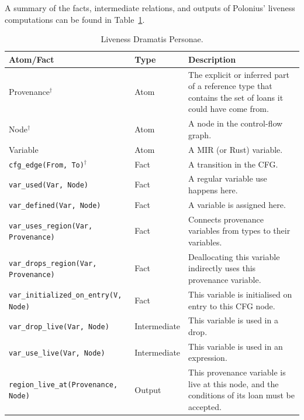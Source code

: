 \documentclass[11pt,a4paper,twoside,openany,draft]{report}
\newcommand{\notmine}[0] {$^\dagger$}
\newcommand{\InDatalog}[1]{\texttt{#1}}
\begin{document}
A summary of the facts, intermediate relations, and outputs of Polonius'
liveness computations can be found in Table~\ref{tab:liveness-facts-recap}.

{ \renewcommand{\arraystretch}{1.0}
\begin{table}[!htbp]
  \begin{tabular}{@{}l l m{5.5cm}}
    Atom/Fact & Type & Description \\ \toprule
    Provenance\notmine{} & Atom & The explicit or inferred part of a reference type that contains the set of loans it could have come from.  \\
    Node\notmine{} & Atom & A node in the control-flow graph. \\
    Variable & Atom & A MIR (or Rust) variable. \\
    \InDatalog{cfg_edge(From, To)}\notmine{} & Fact & A transition in the CFG\@. \\
    \InDatalog{var_used(Var, Node)} & Fact & A regular variable use happens here.\\
    \InDatalog{var_defined(Var, Node)} & Fact & A variable is assigned here.\\
    \InDatalog{var_uses_region(Var, Provenance)} & Fact & Connects provenance variables from types to their variables.\\
    \InDatalog{var_drops_region(Var, Provenance)} & Fact & Deallocating this variable indirectly uses this provenance variable. \\
    \InDatalog{var_initialized_on_entry(V, Node)} & Fact & This variable is initialised on entry to this CFG node. \\
    \InDatalog{var_drop_live(Var, Node)} & Intermediate & This variable is used in a drop. \\
    \InDatalog{var_use_live(Var, Node)} & Intermediate & This variable is used in an expression. \\
    \InDatalog{region_live_at(Provenance, Node)} & Output & This provenance variable is live at this node, and the conditions of its loan must be accepted. \\
  \end{tabular}
\caption[Liveness Dramatis Personae]{Liveness Dramatis Personae.}\label{tab:liveness-facts-recap}
\end{table}%
}
\end{document}
